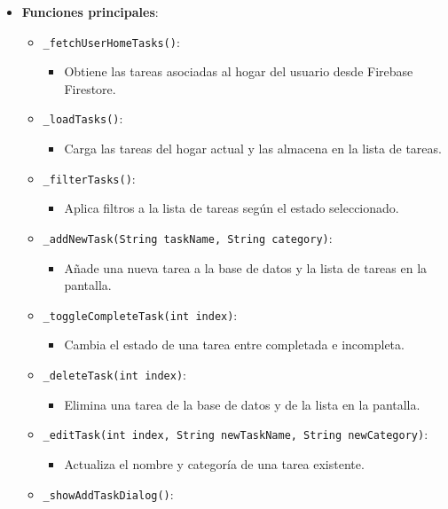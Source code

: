 \documentclass{article}
\begin{document}
\begin{flushleft}
\begin{itemize}
    \item \textbf{Funciones principales}:
    \begin{itemize}
        \item \texttt{\_fetchUserHomeTasks()}:
        \begin{itemize}
            \item Obtiene las tareas asociadas al hogar del usuario desde Firebase Firestore.
        \end{itemize}
        \item \texttt{\_loadTasks()}:
        \begin{itemize}
            \item Carga las tareas del hogar actual y las almacena en la lista de tareas.
        \end{itemize}
        \item \texttt{\_filterTasks()}:
        \begin{itemize}
            \item Aplica filtros a la lista de tareas seg\'un el estado seleccionado.
        \end{itemize}
        \item \texttt{\_addNewTask(String taskName, String category)}:
        \begin{itemize}
            \item A\~nade una nueva tarea a la base de datos y la lista de tareas en la pantalla.
        \end{itemize}
        \item \texttt{\_toggleCompleteTask(int index)}:
        \begin{itemize}
            \item Cambia el estado de una tarea entre completada e incompleta.
        \end{itemize}
        \item \texttt{\_deleteTask(int index)}:
        \begin{itemize}
            \item Elimina una tarea de la base de datos y de la lista en la pantalla.
        \end{itemize}
        \item \texttt{\_editTask(int index, String newTaskName, String newCategory)}:
        \begin{itemize}
            \item Actualiza el nombre y categor\'ia de una tarea existente.
        \end{itemize}
        \item \texttt{\_showAddTaskDialog()}:

\end{itemize}
\end{itemize}
\end{flushleft}
\end{document}
